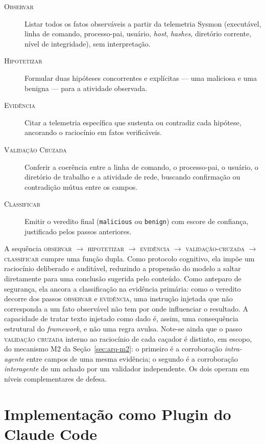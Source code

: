\begin{description}
  \item[\textsc{Observar}] Listar todos os fatos observáveis a partir da
    telemetria Sysmon (executável, linha de comando, processo-pai, usuário,
    \emph{host}, \emph{hashes}, diretório corrente, nível de integridade), sem
    interpretação.
  \item[\textsc{Hipotetizar}] Formular duas hipóteses concorrentes e explícitas —
    uma maliciosa e uma benigna — para a atividade observada.
  \item[\textsc{Evidência}] Citar a telemetria específica que sustenta ou
    contradiz cada hipótese, ancorando o raciocínio em fatos verificáveis.
  \item[\textsc{Validação Cruzada}] Conferir a coerência entre a linha de comando,
    o processo-pai, o usuário, o diretório de trabalho e a atividade de rede,
    buscando confirmação ou contradição mútua entre os campos.
  \item[\textsc{Classificar}] Emitir o veredito final (\texttt{malicious} ou
    \texttt{benign}) com escore de confiança, justificado pelos passos anteriores.
\end{description}

A sequência \textsc{observar} $\rightarrow$ \textsc{hipotetizar} $\rightarrow$
\textsc{evidência} $\rightarrow$ \textsc{validação-cruzada} $\rightarrow$
\textsc{classificar} cumpre uma função dupla. Como protocolo cognitivo, ela impõe
um raciocínio deliberado e auditável, reduzindo a propensão do modelo a saltar
diretamente para uma conclusão sugerida pelo conteúdo. Como anteparo de segurança,
ela ancora a classificação na evidência primária: como o veredito decorre dos
passos \textsc{observar} e \textsc{evidência}, uma instrução injetada que não
corresponda a um fato observável não tem por onde influenciar o resultado. A
capacidade de tratar texto injetado como dado é, assim, uma consequência estrutural
do \emph{framework}, e não uma regra avulsa. Note-se ainda que o passo
\textsc{validação cruzada} interno ao raciocínio de cada caçador é distinto, em
escopo, do mecanismo M2 da Seção~\ref{sec:arq-m2}: o primeiro é a corroboração
\emph{intra-agente} entre campos de uma mesma evidência; o segundo é a corroboração
\emph{interagente} de um achado por um validador independente. Os dois operam em
níveis complementares de defesa.

\section{Implementação como Plugin do Claude Code}
\label{sec:arq-plugin}

